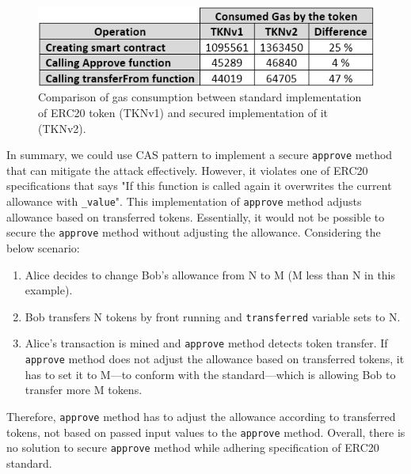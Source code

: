 \begin{figure}[t]
	\centering
	\includegraphics[width=1.0\linewidth]{figures/multiple_withdrawal_22.png}
	\caption{Comparison of gas consumption between standard implementation of ERC20 token (TKNv1) and secured implementation of it (TKNv2).\label{fig:gas}}
\end{figure}

In summary, we could use CAS pattern to implement a secure \texttt{approve} method that can mitigate the attack effectively. However, it violates one of ERC20 specifications that says "If this function is called again it overwrites the current allowance with \texttt{\_value}". This implementation of \texttt{approve} method adjusts allowance based on transferred tokens. Essentially, it would not be possible to secure the \texttt{approve} method without adjusting the allowance. Considering the below scenario:

\begin{enumerate}
	\item Alice decides to change Bob's allowance from N to M (M less than N in this example).
	\item Bob transfers N tokens by front running and \texttt{transferred} variable sets to N.
	\item Alice's transaction is mined and \texttt{approve} method detects token transfer. If \texttt{approve} method does not adjust the allowance based on transferred tokens, it has to set it to M---to conform with the standard---which is allowing Bob to transfer more M tokens.
\end{enumerate}
Therefore, \texttt{approve} method has to adjust the allowance according to transferred tokens, not based on passed input values to the \texttt{approve} method. Overall, there is no solution to secure \texttt{approve} method while adhering specification of ERC20 standard.

